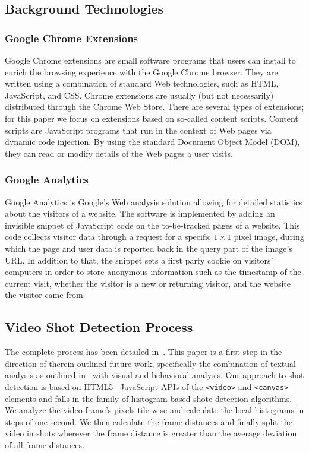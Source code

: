 \documentclass[runningheads,a4paper]{llncs}
\begin{document}
\subsection{Background Technologies}

\subsubsection{Google Chrome Extensions}
Google Chrome extensions are small software programs that users can install to enrich the browsing experience with the Google Chrome browser. They are written using a combination of standard Web technologies, such as HTML, JavaScript, and CSS. Chrome extensions are usually (but not necessarily) distributed through the Chrome Web Store. There are several types of extensions; for this paper we focus on extensions based on so-called content scripts. Content scripts are JavaScript programs that run in the context of Web pages via dynamic code injection. By using the standard Document Object Model (DOM), they can read or modify details of the Web pages a user visits.

\subsubsection{Google Analytics}
Google Analytics is Google's Web analysis solution allowing for detailed statistics about the visitors of a website. The software is implemented by adding an invisible snippet of JavaScript code on the to-be-tracked pages of a website. This code collects visitor data through a request for a specific $1 \times 1$ pixel image, during which the page and user data is reported back in the query part of the image's URL. In addition to that, the snippet sets a first party cookie on visitors' computers in order to store anonymous information such as the timestamp of the current visit, whether the visitor is a new or returning visitor, and the website the visitor came from.

\subsection{Video Shot Detection Process}
The complete process has been detailed in~\cite{artemis}. This paper is a first step in the direction of therein outlined future work, specifically the combination of textual analysis as outlined in~\cite{semwebvid} with visual and behavioral analysis. Our approach to shot detection is based on HTML5~\cite{w3c_html5} JavaScript APIs of the \texttt{<video>} and \texttt{<canvas>} elements and falls in the family of histogram-based shote detection algorithms. We analyze the video frame's pixels tile-wise and calculate the local histograms in steps of one second. We then calculate the frame distances and finally split the video in shots wherever the frame distance is greater than the average deviation of all frame distances.
\end{document}
